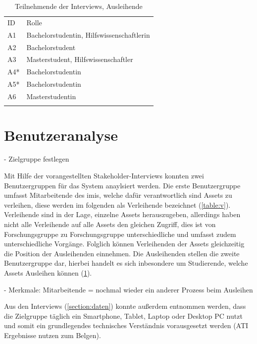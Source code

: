 \begin{table}[h]
    \centering 
    \caption{Teilnehmende der Interviews, Ausleihende}
    \begin{tabular}{ll}
        \arrayrulecolor{maincolor}\hline
        \sffamily\color{maincolor}ID & \sffamily\color{maincolor}Rolle \\
        \arrayrulecolor{maincolor}\hline
            A1  & Bachelorstudentin, Hilfswissenschaftlerin\\
            A2 &  Bachelorstudent\\
            A3  & Masterstudent, Hilfswissenschaftler \\
            A4*  & Bachelorstudentin \\
            A5*  & Bachelorstudentin \\
            A6  & Masterstudentin \\
        \arrayrulecolor{maincolor}\hline
    \end{tabular}
    \label{table:a}
    \hfill
    
\end{table}

\section{Benutzeranalyse}
\label{section:benutzer}
- Zielgruppe festlegen

Mit Hilfe der vorangestellten Stakeholder-Interviews konnten zwei
Benutzergruppen für das System anaylsiert werden. Die erste Benutzergruppe
umfasst Mitarbeitende des \ac{imis}, welche dafür verantwortlich sind Assets zu
verleihen, diese werden im folgenden als Verleihende bezeichnet (\ref{table:v}).
Verleihende sind in der Lage, einzelne Assets herauszugeben, allerdings haben
nicht alle Verleihende auf alle Assets den gleichen Zugriff, dies ist von
Forschungsgruppe zu Forschungsgruppe unterschiedliche und umfasst zudem
unterschiedliche Vorgänge. Folglich können Verleihenden der Assets gleichzeitig
die Position der Ausleihenden einnehmen. Die Ausleihenden stellen die zweite
Benutzergruppe dar, hierbei handelt es sich inbesondere um Studierende, welche
Assets Ausleihen können (\ref{table:a}).

- Merkmale: Mitarbeitende = nochmal wieder ein anderer Prozess beim Ausleihen

Aus den Interviews (\ref{section:daten}) konnte außerdem entnommen werden, dass
die Zielgruppe täglich ein Smartphone, Tablet, Laptop oder Desktop PC nutzt und
somit ein grundlegendes technisches Verständnis vorausgesetzt werden (ATI
Ergebnisse nutzen zum Belgen).


